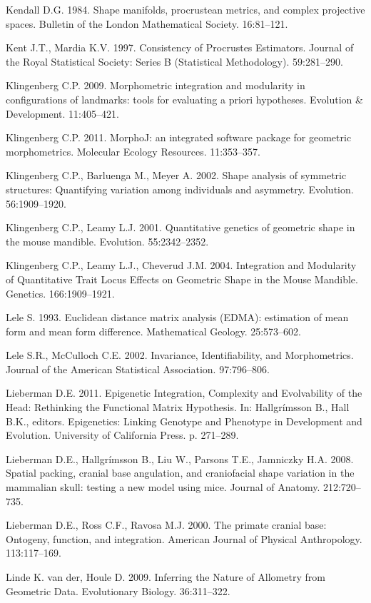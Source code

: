 \documentclass[12pt,]{article}
\begin{document}
Kendall D.G. 1984. Shape manifolds, procrustean metrics, and complex
projective spaces. Bulletin of the London Mathematical Society.
16:81--121.

Kent J.T., Mardia K.V. 1997. Consistency of Procrustes Estimators.
Journal of the Royal Statistical Society: Series B (Statistical
Methodology). 59:281--290.

Klingenberg C.P. 2009. Morphometric integration and modularity in
configurations of landmarks: tools for evaluating a priori hypotheses.
Evolution \& Development. 11:405--421.

Klingenberg C.P. 2011. MorphoJ: an integrated software package for
geometric morphometrics. Molecular Ecology Resources. 11:353--357.

Klingenberg C.P., Barluenga M., Meyer A. 2002. Shape analysis of
symmetric structures: Quantifying variation among individuals and
asymmetry. Evolution. 56:1909--1920.

Klingenberg C.P., Leamy L.J. 2001. Quantitative genetics of geometric
shape in the mouse mandible. Evolution. 55:2342--2352.

Klingenberg C.P., Leamy L.J., Cheverud J.M. 2004. Integration and
Modularity of Quantitative Trait Locus Effects on Geometric Shape in the
Mouse Mandible. Genetics. 166:1909--1921.

Lele S. 1993. Euclidean distance matrix analysis (EDMA): estimation of
mean form and mean form difference. Mathematical Geology. 25:573--602.

Lele S.R., McCulloch C.E. 2002. Invariance, Identifiability, and
Morphometrics. Journal of the American Statistical Association.
97:796--806.

Lieberman D.E. 2011. Epigenetic Integration, Complexity and Evolvability
of the Head: Rethinking the Functional Matrix Hypothesis. In:
Hallgrímsson B., Hall B.K., editors. Epigenetics: Linking Genotype and
Phenotype in Development and Evolution. University of California Press.
p. 271--289.

Lieberman D.E., Hallgrímsson B., Liu W., Parsons T.E., Jamniczky H.A.
2008. Spatial packing, cranial base angulation, and craniofacial shape
variation in the mammalian skull: testing a new model using mice.
Journal of Anatomy. 212:720--735.

Lieberman D.E., Ross C.F., Ravosa M.J. 2000. The primate cranial base:
Ontogeny, function, and integration. American Journal of Physical
Anthropology. 113:117--169.

Linde K. van der, Houle D. 2009. Inferring the Nature of Allometry from
Geometric Data. Evolutionary Biology. 36:311--322.
\end{document}
